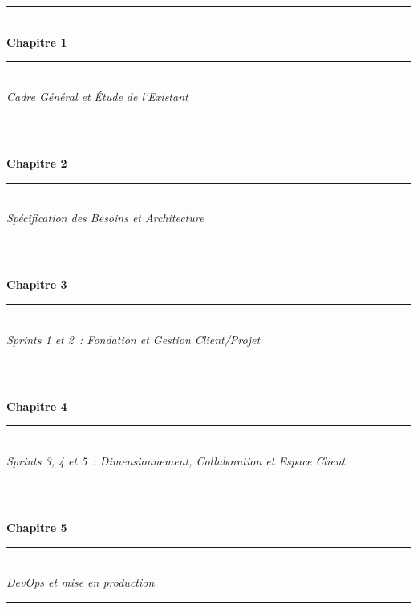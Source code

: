 \documentclass[12pt,a4paper,oneside]{report}
\newcommand{\chapterpage}[2]{%
  \clearpage
  \thispagestyle{empty}
  \vspace*{\fill}
  \begin{center}
    \rule{0.6\textwidth}{1.5pt}\\[24pt]
    {\LARGE\bfseries Chapitre #1}\\[16pt]
    \rule{0.3\textwidth}{0.6pt}\\[20pt]
    {\Large\itshape #2}\\[24pt]
    \rule{0.6\textwidth}{1.5pt}
  \end{center}
  \vspace*{\fill}
  \clearpage
}
\begin{document}










\clearpage
{}

\chapterpage{1}{Cadre G\'en\'eral et \'Etude de l'Existant}


\chapterpage{2}{Sp\'ecification des Besoins et Architecture}


\chapterpage{3}{Sprints 1 et 2~: Fondation et Gestion Client/Projet}


\chapterpage{4}{Sprints 3, 4 et 5~: Dimensionnement, Collaboration et Espace Client}


\chapterpage{5}{DevOps et mise en production}







\end{document}
